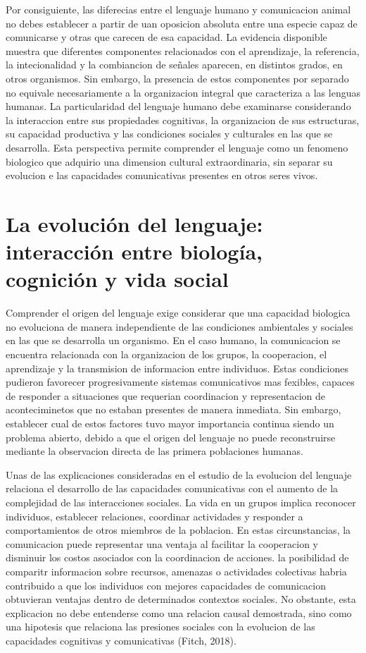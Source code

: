 \documentclass[12pt]{article}
\begin{document}
Por consiguiente, las diferecias entre el lenguaje humano y comunicacion animal no debes establecer a partir de uan oposicion absoluta entre una especie capaz de comunicarse y otras que carecen de esa capacidad. La evidencia disponible muestra que diferentes componentes relacionados con el aprendizaje, la referencia, la intecionalidad y la combiancion de señales aparecen, en distintos grados, en otros organismos. Sin embargo, la presencia de estos componentes por separado no equivale necesariamente a la organizacion integral que caracteriza a las lenguas humanas. La particularidad del lenguaje humano debe examinarse considerando la interaccion entre sus propiedades cognitivas, la organizacion de sus estructuras, su capacidad productiva y las condiciones sociales y culturales en las que se desarrolla. Esta perspectiva permite comprender el lenguaje como un fenomeno biologico que adquirio una dimension cultural extraordinaria, sin separar su evolucion e las capacidades comunicativas presentes en otros seres vivos. 

\section{La evolución del lenguaje: interacción entre biología, cognición y vida social}

Comprender el origen del lenguaje exige considerar que una capacidad biologica no evoluciona de manera independiente de las condiciones ambientales y sociales en las que se desarrolla un organismo. En el caso humano, la comunicacion se encuentra relacionada con la organizacion de los grupos, la cooperacion, el aprendizaje y la transmision de informacion entre individuos. Estas condiciones pudieron favorecer progresivamente sistemas comunicativos mas fexibles, capaces de responder a situaciones que requerian coordinacion y representacion de aconteciminetos que no estaban presentes de manera inmediata. Sin embargo, establecer cual de estos factores tuvo mayor importancia continua siendo un problema abierto, debido a que el origen del lenguaje no puede reconstruirse mediante la observacion directa de las primera poblaciones humanas.

Unas de las explicaciones consideradas en el estudio de la evolucion del lenguaje relaciona el desarrollo de las capacidades comunicativas con el aumento de la complejidad de las interacciones sociales. La vida en un grupos implica reconocer individuos, establecer relaciones, coordinar actividades y responder a comportamientos de otros miembros de la poblacion. En estas circunstancias, la comunicacion puede representar una ventaja al facilitar la cooperacion y disminuir los costos asociados con la coordinacion de acciones. la posibilidad de comparitr informacion sobre recursos, amenazas o actividades colectivas habria contribuido a que los individuos con mejores capacidades de comunicacion obtuvieran ventajas dentro de determinados contextos sociales. No obstante, esta explicacion no debe entenderse como una relacion causal demostrada, sino como una hipotesis que relaciona las presiones sociales con la evolucion de las capacidades cognitivas y comunicativas (Fitch, 2018). 
\end{document}
